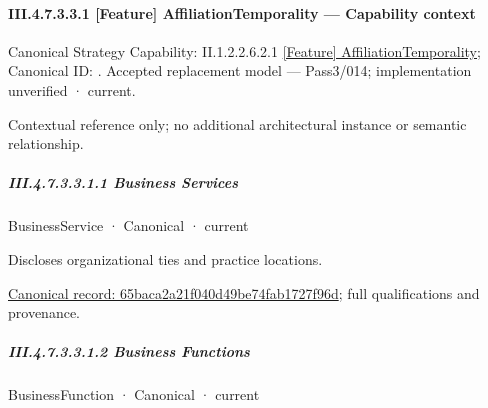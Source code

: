 \paragraph*{III.4.7.3.3.1 [Feature] AffiliationTemporality — Capability context}
\label{navigation:III.4.7.3.3.1}

{\small Canonical Strategy Capability: II.1.2.2.6.2.1 \hyperref[element:6beab7cbd7ec4563a82112445a0ffe46]{[Feature] AffiliationTemporality}; Canonical ID: \texttt{}. Accepted replacement model — Pass3/014; implementation unverified · current.}\par
Contextual reference only; no additional architectural instance or semantic relationship.\par
\subparagraph*{III.4.7.3.3.1.1 Business Services}
\label{navigation:III.4.7.3.3.1.1}

\label{navigation:III.4.7.3.3.1.1.1}

\label{element:65baca2a21f040d49be74fab1727f96d}
{\small BusinessService · Canonical · current}\par

Discloses organizational ties and practice locations.


{\footnotesize \href{../../../../../../../continuum/business/business-service/65baca2a21f040d49be74fab1727f96d.md}{Canonical record: 65baca2a21f040d49be74fab1727f96d}; full qualifications and provenance.}\par
\subparagraph*{III.4.7.3.3.1.2 Business Functions}
\label{navigation:III.4.7.3.3.1.2}

\label{navigation:III.4.7.3.3.1.2.1}

\label{element:7dc829546e99424dbbf8f19b4565d3fc}
{\small BusinessFunction · Canonical · current}\par

